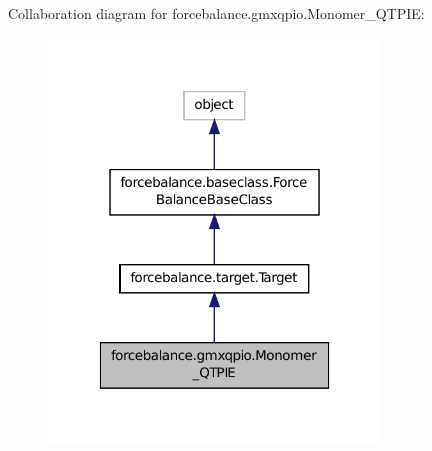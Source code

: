 Collaboration diagram for forcebalance.\-gmxqpio.\-Monomer\-\_\-\-Q\-T\-P\-I\-E\-:
\nopagebreak
\begin{figure}[H]
\begin{center}
\leavevmode
\includegraphics[width=250pt]{classforcebalance_1_1gmxqpio_1_1Monomer__QTPIE__coll__graph}
\end{center}
\end{figure}
